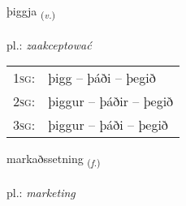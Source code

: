 \documentclass[frontgrid, backgrid]{flacards}\usepackage[]{graphicx}\usepackage[]{xcolor}
\begin{document}
\renewcommand{\flhead}{\vskip5pt \fboxsep=0pt {\small\bfseries\footnotesize Sagnorð | Verb}}
\renewcommand{\fcfoot}{\vskip5pt \fboxsep=0pt \hspace{2pt}{\small\bfseries\footnotesize 2K}}

\renewcommand{\blhead}{\vskip5pt {\small\bfseries\footnotesize Sagnorð | Verb }}
\renewcommand{\bcfoot}{\vskip5pt \hspace{2pt}{\small\bfseries\footnotesize 2K}}


{þiggja \small{\textsubscript{(\textit{v.})}} \\[1ex] %
\textphonetic{[θɪca]} \\
pl.: \emph{zaakceptować} \\  [2ex]
\renewcommand*{\arraystretch}{0.8}
\begin{tabular}{p{1cm}l}
\textsc{1sg}: & þigg -- þáði -- þegið \\ 
\textsc{2sg}: & þiggur -- þáðir -- þegið \\ 
\textsc{3sg}: & þiggur -- þáði -- þegið \\ 
\end{tabular}
}

\renewcommand{\flhead}{\vskip5pt \fboxsep=0pt {\small\bfseries\footnotesize Nafnorð | Noun}}
\renewcommand{\fcfoot}{\vskip5pt \fboxsep=0pt \hspace{2pt}{\small\bfseries\footnotesize 2K}}

\renewcommand{\blhead}{\vskip5pt {\small\bfseries\footnotesize Nafnorð | Noun }}
\renewcommand{\bcfoot}{\vskip5pt \hspace{2pt}{\small\bfseries\footnotesize 2K}}


{markaðssetning \small{\textsubscript{(\textit{f.})}} \\[1ex] %
 \\
pl.: \emph{marketing} \\  [2ex]
\renewcommand*{\arraystretch}{0.8}
}
\end{document}
